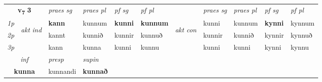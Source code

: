 \noindent
\begin{tabular}{lllllllllll} \toprule
\multicolumn{2}{c}{\textbf{v{\textsubscript{7}}} \Large{\textbf{3}}}  &  \textit{praes sg}  & \textit{praes pl}  &\textit{ pf sg} & \textit{pf pl} &  &  \textit{praes sg}  & \textit{praes pl}  & \textit{pf sg} & \textit{pf pl } \\*
	\cmidrule{3-6} \cmidrule{8-11}
 {\textit{1p}} & \multirow{3}{*}{\begin{turn}{90}\textit{akt ind}\end{turn}} & \textbf{kann} & kunnum & \textbf{kunni} & \textbf{kunnum} & \multirow{3}{*}{\begin{turn}{90}\textit{akt con}\end{turn}} &kunni & kunnum & \textbf{kynni} & kynnum\\*
 {\textit{2p}} &  &  kannt  & kunnið & kunnir & kunnuð & & kunnir & kunnið & kynnir & kynnuð \\*
{\textit{3p}} &  & kann & kunna & kunni & kunnu & & kunni & kunni& kynni & kynnu \\*
\cmidrule{3-6} \cmidrule{8-11}

   \multicolumn{2}{c}{\textit{inf}}     & \textit{presp} & \textit{supin}   \\*
  \multicolumn{2}{c}{\textbf{kunna}}      & kunnandi &  \textbf{kunnað}   \\*
\end{tabular}


